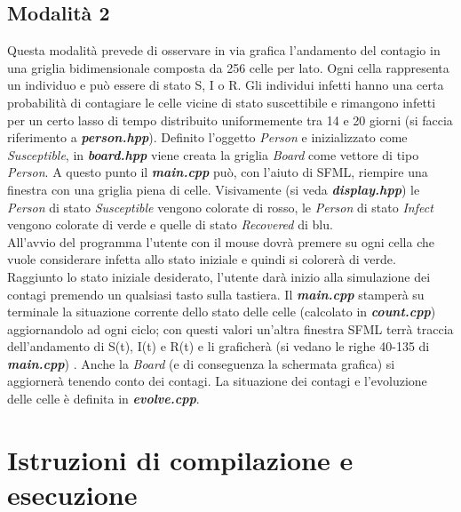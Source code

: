 \documentclass[a4paper,10 pt]{article}
\begin{document}
\subsection{Modalità 2}
Questa modalità prevede di osservare in via grafica l'andamento del contagio in una griglia bidimensionale composta da 256 celle per lato. Ogni cella rappresenta un individuo e può essere di stato S, I o R. Gli individui infetti hanno una certa probabilità di contagiare le celle vicine di stato suscettibile e rimangono infetti per un certo lasso di tempo distribuito uniformemente tra 14 e 20 giorni (si faccia riferimento a \textbf{\textit{person.hpp}}). Definito l'oggetto \textit{Person} e inizializzato come \textit{Susceptible}, in \textbf{\textit{board.hpp}} viene creata la griglia \textit{Board} come vettore di tipo  \textit{Person}. A questo punto il \textbf{\textit{main.cpp}} può, con l'aiuto di SFML, riempire una finestra con una griglia piena di celle. Visivamente (si veda  \textbf{\textit{display.hpp}}) le \textit{Person} di stato \textit{Susceptible} vengono colorate di rosso, le \textit{Person} di stato \textit{Infect} vengono colorate di verde e quelle di stato \textit{Recovered} di blu.
\ \\
All'avvio del programma l'utente con il mouse dovrà premere su ogni cella che vuole considerare infetta allo stato iniziale e quindi si colorerà di verde. Raggiunto lo stato iniziale desiderato, l'utente darà inizio alla simulazione dei contagi premendo un qualsiasi tasto sulla tastiera. Il \textbf{\textit{main.cpp}} stamperà su terminale la situazione corrente dello stato delle celle (calcolato in \textbf{\textit{count.cpp}}) aggiornandolo ad ogni ciclo; con questi valori un'altra finestra SFML terrà traccia dell'andamento di S(t), I(t) e R(t) e li graficherà (si vedano le righe 40-135 di \textbf{\textit{main.cpp}}) . Anche la \textit{Board} (e di conseguenza la schermata grafica) si aggiornerà tenendo conto dei contagi. La situazione dei contagi e l'evoluzione delle celle è definita in \textbf{\textit{evolve.cpp}}.

\section{Istruzioni di compilazione e esecuzione}
\end{document}
